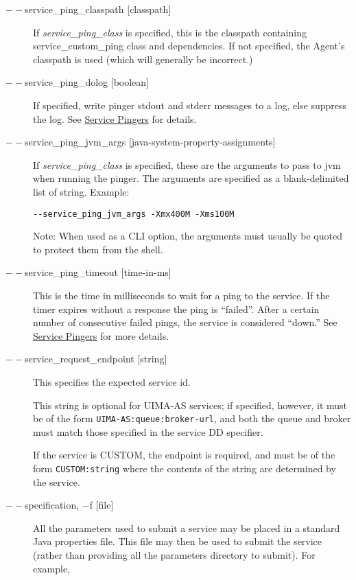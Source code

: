 \begin{description}
      \item[$--$service\_ping\_classpath {[classpath]}] If {\em service\_ping\_class} is specified,
        this is the classpath containing service\_custom\_ping class and dependencies.  If not
        specified, the Agent's classpath is used (which will generally be incorrect.)

      \item[$--$service\_ping\_dolog {[boolean]}] If specified, write pinger stdout and stderr
        messages to a log, else suppress the log. See \hyperref[sec:service.pingers]{Service Pingers}
        for details.

      \item[$--$service\_ping\_jvm\_args {[java-system-property-assignments]}] If 
        {\em service\_ping\_class} is specified, these are the arguments 
        to pass to jvm when running the pinger. The arguments are specified as a blank-delimited
        list of string.  Example:
\begin{verbatim}
--service_ping_jvm_args -Xmx400M -Xms100M
\end{verbatim}
        
        Note: When used as a CLI option, the arguments must usually be
        quoted to protect them from the shell.

      \item[$--$service\_ping\_timeout {[time-in-ms]}] This is the time in milliseconds to wait for a
        ping to the service.  If the timer expires without a response the ping is ``failed''. After
        a certain number of consecutive failed pings, the service is considered ``down.''  See
        \hyperref[sec:service.pingers]{Service Pingers} for more details.

      \item[$--$service\_request\_endpoint {[string]}] This specifies the expected service id.  

        This string is optional for UIMA-AS services; if specified, however, it must be of the
        form {\tt UIMA-AS:queue:broker-url}, and both the queue and broker must match those specified in the
        service DD specifier.

        If the service is CUSTOM, the endpoint is required, and must be of the form
        {\tt CUSTOM:string} where the contents of the string are determined by the service.

      \item[$--$specification, $-$f {[file]}] All the parameters used to submit a service may be placed in a
        standard Java properties file.  This file may then be used to submit the service (rather than
        providing all the parameters directory to submit).
        For example, 


\end{description}
